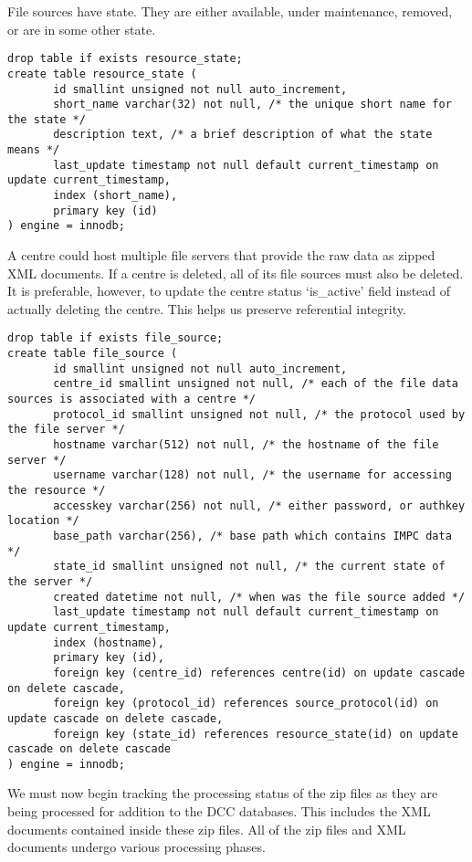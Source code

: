 \documentclass[a4paper,11pt]{article}
\begin{document}
\begin{landscape}
File sources have state. They are either available, under maintenance, removed, or are in some other state.

\begin{Verbatim}[fontsize=\small,formatcom=\color{blue}]
drop table if exists resource_state;
create table resource_state (
       id smallint unsigned not null auto_increment,
       short_name varchar(32) not null, /* the unique short name for the state */
       description text, /* a brief description of what the state means */
       last_update timestamp not null default current_timestamp on update current_timestamp,
       index (short_name),
       primary key (id)
) engine = innodb;
\end{Verbatim}

A centre could host multiple file servers that provide the raw data as zipped XML documents. If a centre is deleted, all of its file sources must also be deleted. It is preferable, however, to update the centre status `is\_active' field instead of actually deleting the centre. This helps us preserve referential integrity.

\begin{Verbatim}[fontsize=\small,formatcom=\color{blue}]
drop table if exists file_source;
create table file_source (
       id smallint unsigned not null auto_increment,
       centre_id smallint unsigned not null, /* each of the file data sources is associated with a centre */
       protocol_id smallint unsigned not null, /* the protocol used by the file server */
       hostname varchar(512) not null, /* the hostname of the file server */
       username varchar(128) not null, /* the username for accessing the resource */
       accesskey varchar(256) not null, /* either password, or authkey location */
       base_path varchar(256), /* base path which contains IMPC data */
       state_id smallint unsigned not null, /* the current state of the server */
       created datetime not null, /* when was the file source added */
       last_update timestamp not null default current_timestamp on update current_timestamp,
       index (hostname),
       primary key (id),
       foreign key (centre_id) references centre(id) on update cascade on delete cascade,
       foreign key (protocol_id) references source_protocol(id) on update cascade on delete cascade,
       foreign key (state_id) references resource_state(id) on update cascade on delete cascade
) engine = innodb;
\end{Verbatim}

We must now begin tracking the processing status of the zip files as they are being processed for addition to the DCC databases. This includes the XML documents contained inside these zip files. All of the zip files and XML documents undergo various processing phases.


\end{landscape}
\end{document}
